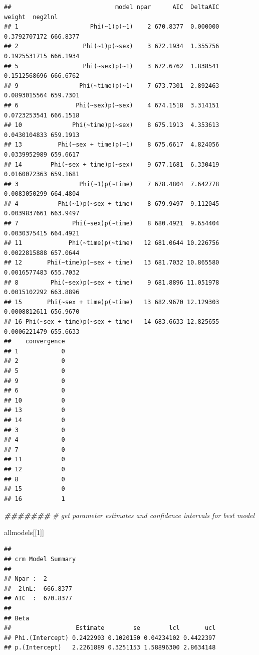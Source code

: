 \documentclass[
]{article}
\newenvironment{Shaded}{\begin{snugshade}}{\end{snugshade}}
\newcommand{\CommentTok}[1]{\textcolor[rgb]{0.56,0.35,0.01}{\textit{#1}}}
\newcommand{\DecValTok}[1]{\textcolor[rgb]{0.00,0.00,0.81}{#1}}
\newcommand{\DocumentationTok}[1]{\textcolor[rgb]{0.56,0.35,0.01}{\textbf{\textit{#1}}}}
\newcommand{\NormalTok}[1]{#1}
\begin{document}
\begin{verbatim}
##                             model npar      AIC  DeltaAIC       weight  neg2lnl
## 1                    Phi(~1)p(~1)    2 670.8377  0.000000 0.3792707172 666.8377
## 2                  Phi(~1)p(~sex)    3 672.1934  1.355756 0.1925531715 666.1934
## 5                  Phi(~sex)p(~1)    3 672.6762  1.838541 0.1512568696 666.6762
## 9                 Phi(~time)p(~1)    7 673.7301  2.892463 0.0893015564 659.7301
## 6                Phi(~sex)p(~sex)    4 674.1518  3.314151 0.0723253541 666.1518
## 10              Phi(~time)p(~sex)    8 675.1913  4.353613 0.0430104833 659.1913
## 13          Phi(~sex + time)p(~1)    8 675.6617  4.824056 0.0339952989 659.6617
## 14        Phi(~sex + time)p(~sex)    9 677.1681  6.330419 0.0160072363 659.1681
## 3                 Phi(~1)p(~time)    7 678.4804  7.642778 0.0083050299 664.4804
## 4           Phi(~1)p(~sex + time)    8 679.9497  9.112045 0.0039837661 663.9497
## 7               Phi(~sex)p(~time)    8 680.4921  9.654404 0.0030375415 664.4921
## 11             Phi(~time)p(~time)   12 681.0644 10.226756 0.0022815888 657.0644
## 12       Phi(~time)p(~sex + time)   13 681.7032 10.865580 0.0016577483 655.7032
## 8         Phi(~sex)p(~sex + time)    9 681.8896 11.051978 0.0015102292 663.8896
## 15       Phi(~sex + time)p(~time)   13 682.9670 12.129303 0.0008812611 656.9670
## 16 Phi(~sex + time)p(~sex + time)   14 683.6633 12.825655 0.0006221479 655.6633
##    convergence
## 1            0
## 2            0
## 5            0
## 9            0
## 6            0
## 10           0
## 13           0
## 14           0
## 3            0
## 4            0
## 7            0
## 11           0
## 12           0
## 8            0
## 15           0
## 16           1
\end{verbatim}

\begin{Shaded}
\begin{Highlighting}[]
\DocumentationTok{\#\#\#\#\#\#\#}
\CommentTok{\# get parameter estimates and confidence intervals for best model}

\NormalTok{allmodels[[}\DecValTok{1}\NormalTok{]]}
\end{Highlighting}
\end{Shaded}

\begin{verbatim}
## 
## crm Model Summary
## 
## Npar :  2
## -2lnL:  666.8377
## AIC  :  670.8377
## 
## Beta
##                  Estimate        se        lcl       ucl
## Phi.(Intercept) 0.2422903 0.1020150 0.04234102 0.4422397
## p.(Intercept)   2.2261889 0.3251153 1.58896300 2.8634148
\end{verbatim}
\end{document}
